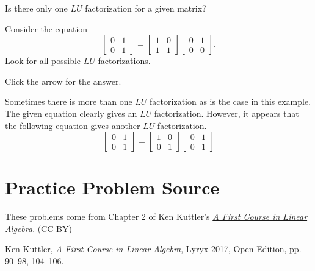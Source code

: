 \documentclass{ximera}
\begin{document}
\begin{problem}\label{prb:4.74} Is there only one $LU$ factorization for a given matrix? 
\begin{hint}
Consider the equation
\begin{equation*}
\left[
\begin{array}{rr}
0 & 1 \\
0 & 1
\end{array}
\right] =\left[
\begin{array}{rr}
1 & 0 \\
1 & 1
\end{array}
\right] \left[
\begin{array}{rr}
0 & 1 \\
0 & 0
\end{array}
\right] .
\end{equation*}
Look for all possible $LU$ factorizations.

Click the arrow for the answer.
\begin{expandable}
Sometimes there is more than one $LU$ factorization as is the case in this
example. The given equation clearly gives an $LU$ factorization. However, it
appears that the following equation gives another $LU$ factorization.
\[
\left[
\begin{array}{cc}
0 & 1 \\
0 & 1
\end{array}
\right] =\left[
\begin{array}{cc}
1 & 0 \\
0 & 1
\end{array}
\right] \left[
\begin{array}{cc}
0 & 1 \\
0 & 1
\end{array}
\right]
\]
\end{expandable}
\end{hint}
\end{problem}




\section*{Practice Problem Source}
These problems come from Chapter 2 of Ken Kuttler's \href{https://open.umn.edu/opentextbooks/textbooks/a-first-course-in-linear-algebra-2017}{\it A First Course in Linear Algebra}. (CC-BY)

Ken Kuttler, {\it  A First Course in Linear Algebra}, Lyryx 2017, Open Edition, pp. 90--98, 104--106.  
\end{document}
